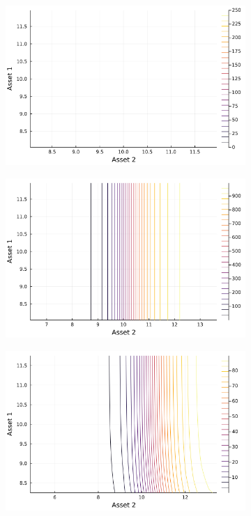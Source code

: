 \documentclass{article}
\begin{document}
\begin{figure}
    \centering
    \begin{subfigure}{0.4\textwidth}
        \includegraphics[width=\textwidth]{../plots/params/baseline/disagreement.png}
        \end{subfigure}
    \begin{subfigure}{0.4\textwidth}
        \includegraphics[width=\textwidth]{../plots/params/a2-mean-shift/disagreement.png}
    \end{subfigure}
    \begin{subfigure}{0.4\textwidth}
        \includegraphics[width=\textwidth]{../plots/params/a2-meanvar-shift/disagreement.png}

\end{subfigure}
\end{figure}
\end{document}
